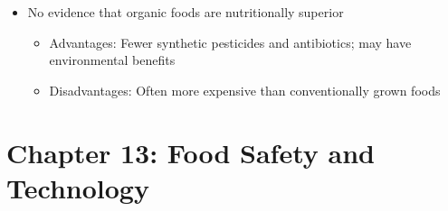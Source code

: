 \documentclass[12pt]{article}
\begin{document}
\begin{itemize}
\begin{itemize}
\begin{itemize}
                            \end{itemize}
                        \item No evidence that organic foods are nutritionally superior
                            \begin{itemize}
                                \item Advantages: Fewer synthetic pesticides and antibiotics; may have environmental benefits
                                \item Disadvantages: Often more expensive than conventionally grown foods
                            \end{itemize}
                    \end{itemize}
            \end{itemize}

    \section{Chapter 13: Food Safety and Technology}
\end{document}
